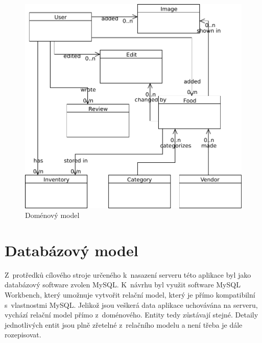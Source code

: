 \documentclass[thesis=B,czech]{FITthesis}[2013/10/20]
\begin{document}
\begin{figure}[H]
  \centering
  \includegraphics[scale=0.75]{diagrams/model}
  \caption{Doménový model}
  \label{fig:DomainModel}
\end{figure}

\section{Databázový model}

Z~protředků cílového stroje určeného k~nasazení serveru této aplikace byl jako databázový software zvolen MySQL. K~návrhu byl využit software MySQL Workbench, který umožnuje vytvořit relační model, který je přímo kompatibilní s~vlastnostmi MySQL. Jelikož jsou veškerá data aplikace uchovávána na serveru, vychází relační model přímo z~doménového. Entity tedy zůstávají stejné. Detaily jednotlivých entit jsou plně zřetelné z~relačního modelu a není třeba je dále rozepisovat.
\end{document}
